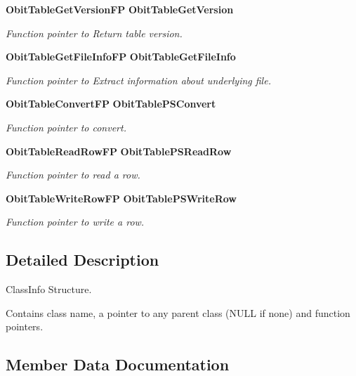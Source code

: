 \begin{CompactItemize}
{\bf Obit\-Table\-Get\-Version\-FP} {\bf Obit\-Table\-Get\-Version}
\begin{CompactList}\small\item\em Function pointer to Return table version. \item\end{CompactList}\item 
{\bf Obit\-Table\-Get\-File\-Info\-FP} {\bf Obit\-Table\-Get\-File\-Info}
\begin{CompactList}\small\item\em Function pointer to Extract information about underlying file. \item\end{CompactList}\item 
{\bf Obit\-Table\-Convert\-FP} {\bf Obit\-Table\-PSConvert}
\begin{CompactList}\small\item\em Function pointer to convert. \item\end{CompactList}\item 
{\bf Obit\-Table\-Read\-Row\-FP} {\bf Obit\-Table\-PSRead\-Row}
\begin{CompactList}\small\item\em Function pointer to read a row. \item\end{CompactList}\item 
{\bf Obit\-Table\-Write\-Row\-FP} {\bf Obit\-Table\-PSWrite\-Row}
\begin{CompactList}\small\item\em Function pointer to write a row. \item\end{CompactList}\end{CompactItemize}


\subsection{Detailed Description}
Class\-Info Structure. 

Contains class name, a pointer to any parent class (NULL if none) and function pointers. 



\subsection{Member Data Documentation}
